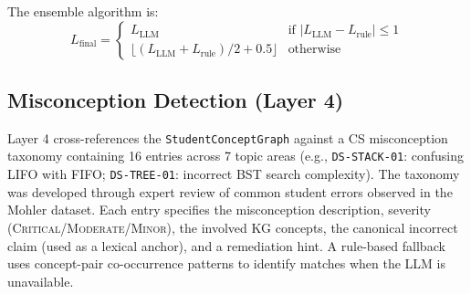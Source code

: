 \documentclass[conference]{IEEEtran}
\begin{document}
The ensemble algorithm is:
\begin{equation}
  L_{\text{final}} =
  \begin{cases}
    L_{\text{LLM}} & \text{if } |L_{\text{LLM}} - L_{\text{rule}}| \leq 1 \\
    \lfloor(L_{\text{LLM}} + L_{\text{rule}}) / 2 + 0.5\rfloor & \text{otherwise}
  \end{cases}
  \label{eq:ensemble}
\end{equation}

\subsection{Misconception Detection (Layer 4)}

Layer 4 cross-references the \texttt{StudentConceptGraph} against a
CS misconception taxonomy containing 16 entries across 7 topic areas
(e.g., \texttt{DS-STACK-01}: confusing LIFO with FIFO;
\texttt{DS-TREE-01}: incorrect BST search complexity).
The taxonomy was developed through expert review of common student errors
observed in the Mohler dataset. Each entry specifies the misconception
description, severity (\textsc{Critical}/\textsc{Moderate}/\textsc{Minor}), the
involved KG concepts, the canonical incorrect claim (used as a lexical anchor),
and a remediation hint. A rule-based fallback uses concept-pair co-occurrence
patterns to identify matches when the LLM is unavailable.
\end{document}
